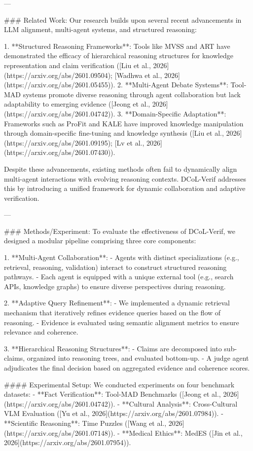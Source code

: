 ---

### Related Work:
Our research builds upon several recent advancements in LLM alignment, multi-agent systems, and structured reasoning:

1. **Structured Reasoning Frameworks**: Tools like MVSS and ART have demonstrated the efficacy of hierarchical reasoning structures for knowledge representation and claim verification ([Liu et al., 2026](https://arxiv.org/abs/2601.09504); [Wadhwa et al., 2026](https://arxiv.org/abs/2601.05455)).
2. **Multi-Agent Debate Systems**: Tool-MAD systems promote diverse reasoning through agent collaboration but lack adaptability to emerging evidence ([Jeong et al., 2026](https://arxiv.org/abs/2601.04742)).
3. **Domain-Specific Adaptation**: Frameworks such as ProFit and KALE have improved knowledge manipulation through domain-specific fine-tuning and knowledge synthesis ([Liu et al., 2026](https://arxiv.org/abs/2601.09195); [Lv et al., 2026](https://arxiv.org/abs/2601.07430)).

Despite these advancements, existing methods often fail to dynamically align multi-agent interactions with evolving reasoning contexts. DCoL-Verif addresses this by introducing a unified framework for dynamic collaboration and adaptive verification.

---

### Methods/Experiment:
To evaluate the effectiveness of DCoL-Verif, we designed a modular pipeline comprising three core components:

1. **Multi-Agent Collaboration**:
   - Agents with distinct specializations (e.g., retrieval, reasoning, validation) interact to construct structured reasoning pathways.
   - Each agent is equipped with a unique external tool (e.g., search APIs, knowledge graphs) to ensure diverse perspectives during reasoning.

2. **Adaptive Query Refinement**:
   - We implemented a dynamic retrieval mechanism that iteratively refines evidence queries based on the flow of reasoning.
   - Evidence is evaluated using semantic alignment metrics to ensure relevance and coherence.

3. **Hierarchical Reasoning Structures**:
   - Claims are decomposed into sub-claims, organized into reasoning trees, and evaluated bottom-up.
   - A judge agent adjudicates the final decision based on aggregated evidence and coherence scores.

#### Experimental Setup:
We conducted experiments on four benchmark datasets:
- **Fact Verification**: Tool-MAD Benchmarks ([Jeong et al., 2026](https://arxiv.org/abs/2601.04742)).
- **Cultural Analysis**: Cross-Cultural VLM Evaluation ([Yu et al., 2026](https://arxiv.org/abs/2601.07984)).
- **Scientific Reasoning**: Time Puzzles ([Wang et al., 2026](https://arxiv.org/abs/2601.07148)).
- **Medical Ethics**: MedES ([Jin et al., 2026](https://arxiv.org/abs/2601.07954)).

